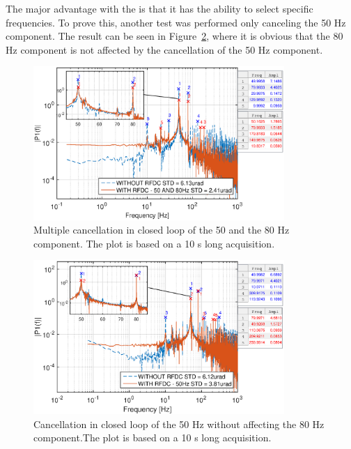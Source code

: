 The major advantage with the \abbrRFDC is that it has the ability to select specific frequencies. To prove this, another test was performed only canceling the 50 Hz component. The result can be seen in Figure~\ref{fig:mult50no80}, where it is obvious that the 80 Hz component is not affected by the cancellation of the 50 Hz component.

\begin{figure}[h]
  \centering %
  \includegraphics[width=0.85\textwidth]{fig/matlab/mult_50_80_closed_loop}
  \caption{\label{fig:mult5080} Multiple cancellation in closed loop of the 50 and the 80 Hz component. The plot is based on a 10 s long acquisition.}
\end{figure}

\begin{figure}[h]
  \centering %
  \includegraphics[width=0.85\textwidth]{fig/matlab/mult_50_selected_closed_loop}
  \caption{\label{fig:mult50no80} Cancellation in closed loop of the 50 Hz without affecting the 80 Hz component.The plot is based on a 10 s long acquisition.}
\end{figure}

\FloatBarrier
